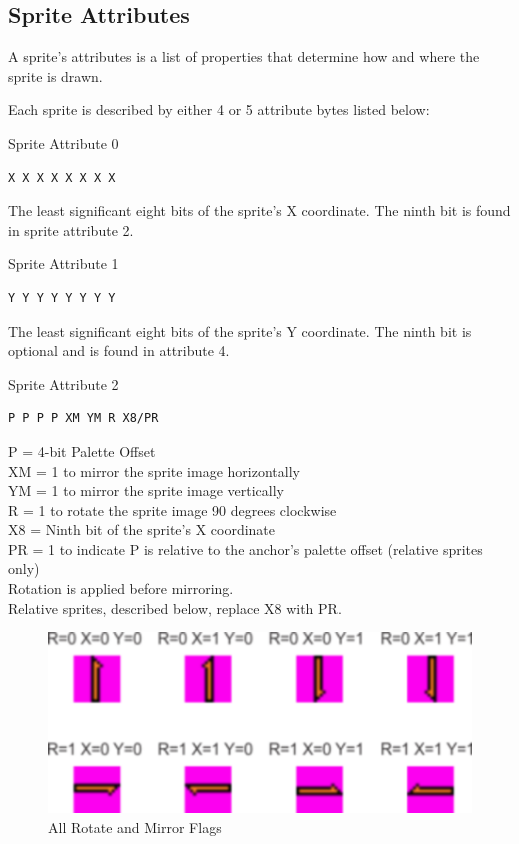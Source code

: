 \subsection{Sprite Attributes}
A sprite’s attributes is a list of properties that determine how and
where the sprite is drawn.

Each sprite is described by either 4 or 5 attribute bytes listed
below:

Sprite Attribute 0
\begin{verbatim}
X X X X X X X X
\end{verbatim}
The least significant eight bits of the sprite’s X coordinate. The
ninth bit is found in sprite attribute 2.

Sprite Attribute 1
\begin{verbatim}
Y Y Y Y Y Y Y Y
\end{verbatim}
The least significant eight bits of the sprite’s Y coordinate. The
ninth bit is optional and is found in attribute 4.

Sprite Attribute 2
\begin{verbatim}
P P P P XM YM R X8/PR
\end{verbatim}
P = 4-bit Palette Offset\\
XM = 1 to mirror the sprite image horizontally\\
YM = 1 to mirror the sprite image vertically\\
R = 1 to rotate the sprite image 90 degrees clockwise\\
X8 = Ninth bit of the sprite’s X coordinate\\
PR = 1 to indicate P is relative to the anchor’s palette offset
(relative sprites only)\\
Rotation is applied before mirroring.\\
Relative sprites, described below, replace X8 with PR.

\begin{figure}\centering
  \includegraphics{video/flags.png}
  \caption{All Rotate and Mirror Flags}
\end{figure}


